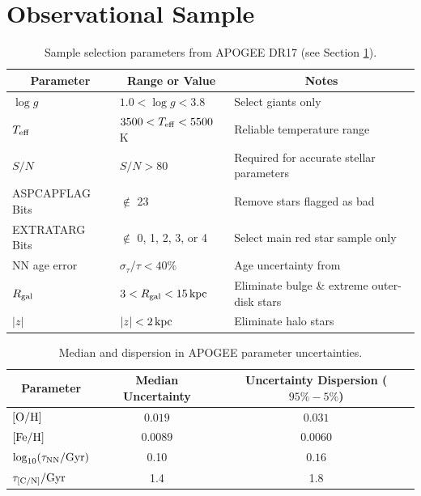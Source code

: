 \documentclass[twocolumn,twocolappendix,linenumbers]{aastex631}
\newcommand{\mathOH}{{\rm [O/H]}}
\newcommand{\mathFeH}{{\rm [Fe/H]}}
\newcommand{\mathOFe}{{\rm [O/Fe]}}
\newcommand{\kpc}{\,{\rm kpc}}
\begin{document}
\section{Observational Sample}
\label{sec:observational-sample}

\begin{table}
    \centering
    \caption{Sample selection parameters from APOGEE DR17 (see Section \ref{sec:observational-sample}).}
    \label{tab:sample}
    \begin{tabular}{lll}
        \hline\hline
        \multicolumn{1}{c}{Parameter} & \multicolumn{1}{c}{Range or Value} & \multicolumn{1}{c}{Notes} \\
        \hline
        $\log g$            & $1.0 < \log g < 3.8$          & Select giants only \\
        $T_{\rm eff}$       & $3500 < T_{\rm eff} < 5500$ K & Reliable temperature range \\
        $S/N$               & $S/N > 80$                    & Required for accurate stellar parameters \\
        ASPCAPFLAG Bits     & $\notin$ 23                   & Remove stars flagged as bad \\
        EXTRATARG Bits      & $\notin$ 0, 1, 2, 3, or 4     & Select main red star sample only \\
        NN age error        & $\sigma_\tau/\tau < 40\%$     & Age uncertainty from \citet{leung_variational_2023} \\
        $R_{\rm gal}$     & $3 < R_{\rm gal} < 15\kpc$    & Eliminate bulge \& extreme outer-disk stars \\
        $|z|$               & $|z| < 2\kpc$                 & Eliminate halo stars \\
        \hline
    \end{tabular}
\end{table}

\begin{table}
    \centering
    \caption{Median and dispersion in APOGEE parameter uncertainties.}
    \label{tab:uncertainties}
    \begin{tabular}{lcc}
        \hline\hline
        \multicolumn{1}{c}{Parameter} & \multicolumn{1}{c}{Median Uncertainty} & \multicolumn{1}{c}{Uncertainty Dispersion ($95\%-5\%$)} \\
        \hline
        $\mathOH$   & $0.019$    & $0.031$ \\
        $\mathFeH$  & $0.0089$   & $0.0060$ \\
        $\log_{10}(\tau_{\rm NN}/{\rm Gyr})$    & 0.10   & $0.16$ \\
        $\tau_{\rm [C/N]}/{\rm Gyr}$     & 1.4   & 1.8 \\
        \hline
    \end{tabular}
\end{table}
\end{document}
